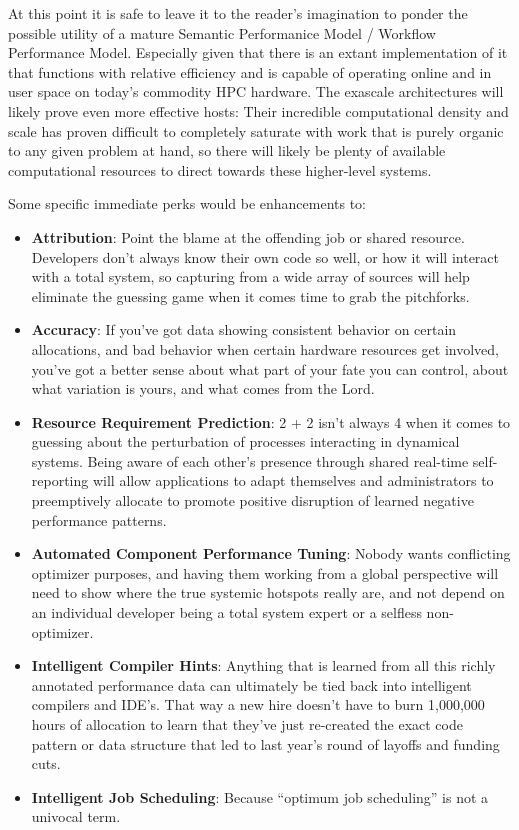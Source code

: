 At this point it is safe to leave it to the reader's imagination to
ponder the possible utility of a mature Semantic Performanice Model /
Workflow Performance Model.
%
Especially given that there is an extant implementation of it that
functions with relative efficiency and is capable of operating online
and in user space on today's commodity HPC hardware.
%
The exascale architectures will likely prove even more effective
hosts: Their incredible computational density and scale has proven
difficult to completely saturate with work that is purely organic to
any given problem at hand, so there will likely be plenty of available
computational resources to direct towards these higher-level systems.

Some specific immediate perks would be enhancements to:
%
\begin{itemize}
    \item \textbf{Attribution}: Point the blame at the offending job
      or shared resource.
      Developers don't always know their own code so well, or how it
      will interact with a total system, so capturing from a wide
      array of sources will help eliminate the guessing game when it
      comes time to grab the pitchforks.
    \item \textbf{Accuracy}: If you've got data showing consistent behavior on
      certain allocations, and bad behavior when certain hardware resources
      get involved, you've got a better sense about what part of your
      fate you can control, about what variation is yours, and what comes
      from the Lord.
    \item \textbf{Resource Requirement Prediction}: 2 + 2 isn't always
      4 when it comes to guessing about the perturbation of processes
      interacting in dynamical systems.
      Being aware of each other's presence through shared real-time
      self-reporting will allow applications to adapt themselves and
      administrators to preemptively allocate to promote positive
      disruption of learned negative performance patterns.
    \item \textbf{Automated Component Performance Tuning}: Nobody
      wants conflicting optimizer purposes, and having them working
      from a global perspective will need to show where the true
      systemic hotspots really are, and not depend on an individual
      developer being a total system expert or a selfless
      non-optimizer.
    \item \textbf{Intelligent Compiler Hints}: Anything that is learned from all
      this richly annotated performance data can ultimately be tied back
      into intelligent compilers and IDE's.
      That way a new hire doesn't have to burn 1,000,000 hours of
      allocation to learn that they've just re-created the exact code
      pattern or data structure that led to last year's round of
      layoffs and funding cuts.
    \item \textbf{Intelligent Job Scheduling}: Because ``optimum job
      scheduling'' is not a univocal term.
\end{itemize}

